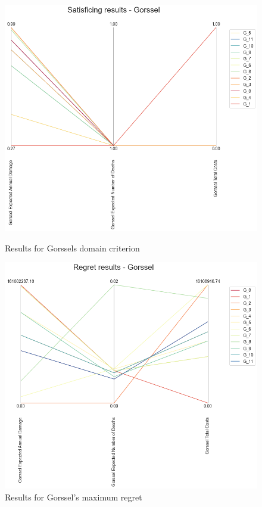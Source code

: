 \begin{figure}[H]
  \centering
  \begin{minipage}[b]{0.4\textwidth}
    \includegraphics[width=1.15\textwidth]{report/figures/results/domain_criterion_Gorssel.png}
    \caption{Results for Gorssels domain criterion}
    \label{fig:domain_criterion_gorssel}
  \end{minipage}
  \hfill
  \begin{minipage}[b]{0.4\textwidth}
    \includegraphics[width=1.15\textwidth]{report/figures/results/regret_figure_Gorssel.png}
    \caption{Results for Gorssel's maximum regret}
    \label{fig:regret_gorssel}
  \end{minipage}
\end{figure}




